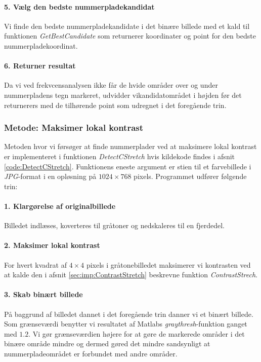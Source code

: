 \paragraph{5. Vælg den bedste nummerpladekandidat}
Vi finde den bedste nummerpladekandidate i det binære billede med et kald til funktionen \textit{GetBestCandidate} som returnerer koordinater og point for den bedste nummerpladekoordinat.

\paragraph{6. Returner resultat}
Da vi ved frekvcensanalysen ikke får de hvide områder over og under nummerpladens tegn markeret, udvidder vikandidatområdet i højden før det returnerers med de tilhørende point som udregnet i det foregående trin.


\subsubsection{Metode: Maksimer lokal kontrast}
Metoden hvor vi førsøger at finde nummerplader ved at maksimere lokal kontrast er implementeret i funktionen \textit{DetectCStretch} hvis kildekode findes i afsnit \vref{code:DetectCStretch}. Funktionens eneste argument er stien til et farvebillede i \textit{JPG}-format i en opløsning på $1024 \times 768$ pixels. Programmet udfører følgende trin:

\paragraph{1. Klargørelse af originalbillede}
Billedet indlæses, koverteres til gråtoner og nedskaleres til en fjerdedel. 

\paragraph{2. Maksimer lokal kontrast}
For hvert kvadrat af $4 \times 4$ pixels i gråtonebilledet maksimerer vi kontrasten ved at kalde den i afsnit \vref{sec:imp:ContrastStretch} beskrevne funktion \textit{ContrastStrech}.

\paragraph{3. Skab binært billede}
På baggrund af billedet dannet i det foregående trin danner vi et binært billede. Som grænseværdi benytter vi resultatet af Matlabs \textit{graythresh}-funktion ganget med $1.2$. Vi gør grænseværdien højere for at gøre de markerede områder i det binære område mindre og dermed gøred det mindre sandsynligt at nummerpladeområdet er forbundet med andre områder.

